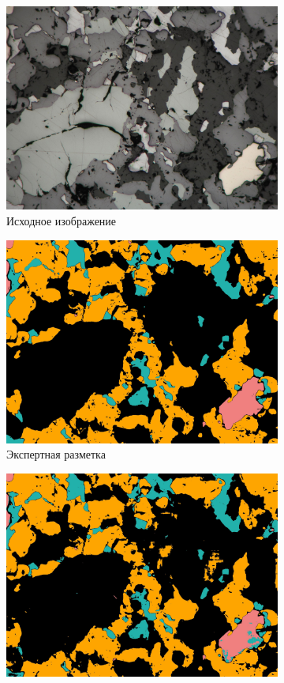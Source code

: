 \begin{figure}[H]
\begin{subfigure}{.33\textwidth}
  \centering
  \includegraphics[width=.9\linewidth]{pics/image_3_src.jpg}
  \caption{Исходное изображение}
  \label{fig:sfig1_1}
\end{subfigure}%
\begin{subfigure}{.33\textwidth}
  \centering
  \includegraphics[width=.9\linewidth]{pics/image_3_gt.jpg}
  \caption{Экспертная разметка}
  \label{fig:sfig1_2}
\end{subfigure}%
\begin{subfigure}{.33\textwidth}
  \centering
  \includegraphics[width=.9\linewidth]{pics/image_3_pred.jpg}

\end{subfigure}
\end{figure}
